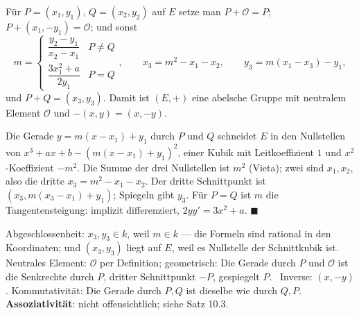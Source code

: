 \begin{merksatz}
Für $P = (x_1, y_1)$, $Q = (x_2, y_2)$ auf $E$ setze man $P + \mathcal O = P$; $P + (x_1, -y_1) = \mathcal O$; und sonst
\[ m = \begin{cases}\dfrac{y_2 - y_1}{x_2 - x_1} & P\ne Q\\[8pt] \dfrac{3x_1^{2} + a}{2y_1} & P = Q\end{cases}, \qquad x_3 = m^{2} - x_1 - x_2, \qquad y_3 = m(x_1 - x_3) - y_1, \]
und $P + Q = (x_3, y_3)$. Damit ist $(E, +)$ eine abelsche Gruppe mit neutralem Element $\mathcal O$ und $-(x, y) = (x, -y)$.

Die Gerade $y = m(x - x_1) + y_1$ durch $P$ und $Q$ schneidet $E$ in den Nullstellen von $x^{3} + ax + b - (m(x - x_1) + y_1)^{2}$, einer Kubik mit Leitkoeffizient $1$ und $x^{2}$-Koeffizient $-m^{2}$. Die Summe der drei Nullstellen ist $m^{2}$ (Vieta); zwei sind $x_1, x_2$, also die dritte $x_3 = m^{2} - x_1 - x_2$. Der dritte Schnittpunkt ist $(x_3, m(x_3 - x_1) + y_1)$; Spiegeln gibt $y_3$. Für $P = Q$ ist $m$ die Tangentensteigung: implizit differenziert, $2yy' = 3x^{2} + a$. $\blacksquare$

Abgeschlossenheit: $x_3, y_3\in k$, weil $m\in k$ --- die Formeln sind rational in den Koordinaten; und $(x_3, y_3)$ liegt auf $E$, weil es Nullstelle der Schnittkubik ist. Neutrales Element: $\mathcal O$ per Definition; geometrisch: Die Gerade durch $P$ und $\mathcal O$ ist die Senkrechte durch $P$, dritter Schnittpunkt $-P$, gespiegelt $P$. \checkmark\ Inverse: $(x, -y)$. Kommutativität: Die Gerade durch $P, Q$ ist dieselbe wie durch $Q, P$. \textbf{Assoziativität}: nicht offensichtlich; siehe Satz 10.3.

\begin{center}
\begin{minipage}{0.88\textwidth}
\end{minipage}
\end{center}
\end{merksatz}

